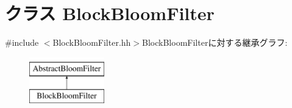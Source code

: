 \hypertarget{classBlockBloomFilter}{
\section{クラス BlockBloomFilter}
\label{classBlockBloomFilter}
}


{\ttfamily \#include $<$BlockBloomFilter.hh$>$}BlockBloomFilterに対する継承グラフ:\begin{figure}[H]
\begin{center}
\leavevmode
\includegraphics[height=2cm]{classBlockBloomFilter}
\end{center}
\end{figure}
